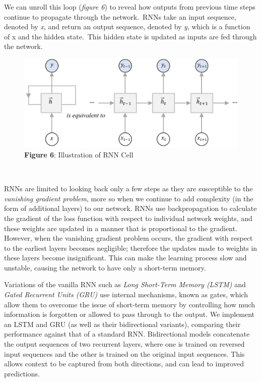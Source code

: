 \documentclass[12pt,a4paper]{article}
\begin{document}
\hspace{-20pt}\begin{minipage}{0.6\textwidth}	
	 We can unroll this loop (\textit{figure 6}) to reveal how outputs from previous time steps continue to propagate through the network.\ RNNs take an input sequence, denoted by \textit{x}, and return an output sequence, denoted by \textit{y}, which is a function of x and the hidden state.\ This hidden state is updated as inputs are fed through the network.\\
\end{minipage}
\hspace{10pt}
\begin{minipage}{0.4\textwidth}
	\vspace{-40pt}
	\begin{figure}[H]
		\includegraphics[width=1\textwidth]{Images/RNN_diagram1.png}\\
		\centering\textbf{Figure 6}: Illustration of RNN Cell
	\end{figure}
\end{minipage}\\\vspace{-10pt}

\noindent RNNs are limited to looking back only a few steps as they are susceptible to the \textit{vanishing gradient problem}, more so when we continue to add complexity (in the form of additional layers) to our network. RNNs use backpropagation to calculate the gradient of the loss function with respect to individual network weights, and these weights are updated in a manner that is proportional to the gradient. However, when the vanishing gradient problem occurs, the gradient with respect to the earliest layers becomes negligible; therefore the updates made to weights in these layers become insignificant. This can make the learning process slow and unstable, causing the network to have only a short-term memory.

Variations of the vanilla RNN such as \textit{Long Short-Term Memory (LSTM)} \cite{hochreiter1997long} and \textit{Gated Recurrent Units (GRU)}\cite{cho2014learning} use internal mechanisms, known as gates, which allow them to overcome the issue of short-term memory by controlling how much information is forgotten or allowed to pass through to the output. We implement an LSTM and GRU (as well as their bidirectional variants), comparing their performance against that of a standard RNN. Bidirectional models concatenate the output sequences of two recurrent layers, where one is trained on reversed input sequences and the other is trained on the original input sequences. This allows context to be captured from both directions, and can lead to improved predictions.
\end{document}

